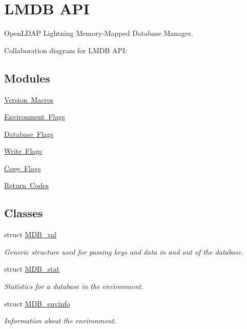 \hypertarget{group__mdb}{}\section{L\+M\+DB A\+PI}
\label{group__mdb}


Open\+L\+D\+AP Lightning Memory-\/\+Mapped Database Manager.  


Collaboration diagram for L\+M\+DB A\+PI\+:
\subsection*{Modules}
\begin{DoxyCompactItemize}
\item 
\mbox{\hyperlink{group___version}{Version Macros}}
\item 
\mbox{\hyperlink{group__mdb__env}{Environment Flags}}
\item 
\mbox{\hyperlink{group__mdb__dbi__open}{Database Flags}}
\item 
\mbox{\hyperlink{group__mdb__put}{Write Flags}}
\item 
\mbox{\hyperlink{group__mdb__copy}{Copy Flags}}
\item 
\mbox{\hyperlink{group__errors}{Return Codes}}
\end{DoxyCompactItemize}
\subsection*{Classes}
\begin{DoxyCompactItemize}
\item 
struct \mbox{\hyperlink{struct_m_d_b__val}{M\+D\+B\+\_\+val}}
\begin{DoxyCompactList}\small\item\em Generic structure used for passing keys and data in and out of the database. \end{DoxyCompactList}\item 
struct \mbox{\hyperlink{struct_m_d_b__stat}{M\+D\+B\+\_\+stat}}
\begin{DoxyCompactList}\small\item\em Statistics for a database in the environment. \end{DoxyCompactList}\item 
struct \mbox{\hyperlink{struct_m_d_b__envinfo}{M\+D\+B\+\_\+envinfo}}
\begin{DoxyCompactList}\small\item\em Information about the environment. \end{DoxyCompactList}\end{DoxyCompactItemize}
